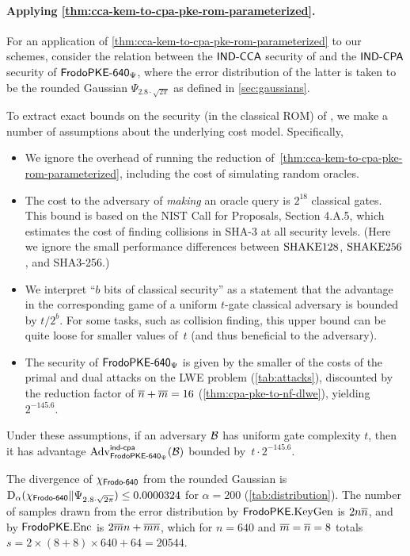 \documentclass{iacrcc}
\begin{document}
\paragraph{Applying \autoref{thm:cca-kem-to-cpa-pke-rom-parameterized}.}

For an application of
\autoref{thm:cca-kem-to-cpa-pke-rom-parameterized} to our schemes,
consider the relation between the $\textsf{\upshape\mdseries IND-CCA}$ security of \FrodoKEMLOne
and the $\textsf{\upshape\mdseries IND-CPA}$ security of $\textsf{\upshape\mdseries FrodoPKE-640}_\Psi$, where the error
distribution of the latter is taken to be the rounded Gaussian
$\Psi_{2.8\cdot\sqrt{2\pi}}$ as defined in \autoref{sec:gaussians}.

To extract exact bounds on the \INDCCA security (in the classical ROM)
of \FrodoKEMLOne, we make a number of assumptions about the underlying
cost model. Specifically,
\begin{itemize}
\item We ignore the overhead of running the reduction
  of~\autoref{thm:cca-kem-to-cpa-pke-rom-parameterized}, including the
  cost of simulating random oracles.
\item The cost to the adversary of \emph{making} an oracle query is
  $2^{18}$ classical gates. This bound is based on the NIST Call for
  Proposals, Section 4.A.5, which estimates the cost of finding collisions
  in SHA-3 at all security levels. (Here we
  ignore the small performance differences between $\textrm{\upshape\mdseries SHAKE}128$,
  $\textrm{\upshape\mdseries SHAKE}256$, and SHA3-256.)
\item We interpret ``$b$ bits of
  classical security'' as a statement that the advantage in the
  corresponding game of a uniform $t$-gate classical adversary is
  bounded by $t/2^b$. For some tasks, such as collision finding,
  this upper bound can be quite loose for smaller values
  of~$t$ (and thus beneficial to the adversary).
\item The \INDCPA security of $\textsf{\upshape\mdseries FrodoPKE-640}_\Psi$ is given by the
  smaller of the costs of the primal and dual attacks on the LWE
  problem (\autoref{tab:attacks}), discounted by the reduction factor
  of $\overline{n} + \overline{m}=16$ (\autoref{thm:cpa-pke-to-nf-dlwe}),
  yielding~$2^{-145.6}$.
\end{itemize}

Under these assumptions, if an adversary $\mathcal{B}$ has uniform gate
complexity $t$, then it has advantage
$\mathrm{Adv}^{\textsf{\upshape\mdseries \textsf{\upshape\mdseries ind-cpa}}}_{\textsf{\upshape\mdseries FrodoPKE-640}_\Psi}(\mathcal{B})$ bounded
by~$t\cdot 2^{-145.6}$.

The \renyi divergence of $\chi_\textsf{\upshape\mdseries Frodo-640}$ from the rounded Gaussian
is $\mathrm{D}_\alpha(\chi_\textsf{\upshape\mdseries Frodo-640}\| \Psi_{2.8\cdot \sqrt{2\pi}}) \leq
0.0000324$ for $\alpha=200$ (\autoref{tab:distribution}). The number of
samples drawn from the error distribution by $\textsf{\upshape\mdseries FrodoPKE}.\textrm{\upshape\mdseries KeyGen}$ is
$2n\overline{n}$, and by $\textsf{\upshape\mdseries FrodoPKE}.\textrm{\upshape\mdseries Enc}$ is $2\overline{m} n+\overline{m} \overline{n}$, which
for $n=640$ and $\overline{m}=\overline{n}=8$ totals
$s=2\times(8 + 8)\times 640+64=20544$.
\end{document}
